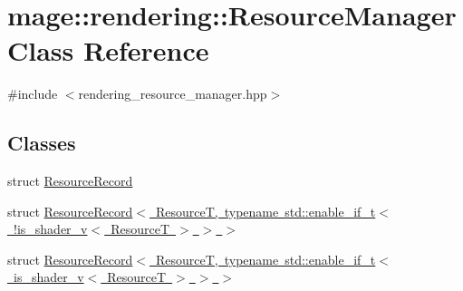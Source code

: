 \hypertarget{classmage_1_1rendering_1_1_resource_manager}{}\section{mage\+:\+:rendering\+:\+:Resource\+Manager Class Reference}
\label{classmage_1_1rendering_1_1_resource_manager}


{\ttfamily \#include $<$rendering\+\_\+resource\+\_\+manager.\+hpp$>$}

\subsection*{Classes}
\begin{DoxyCompactItemize}
\item 
struct \mbox{\hyperlink{structmage_1_1rendering_1_1_resource_manager_1_1_resource_record}{Resource\+Record}}
\item 
struct \mbox{\hyperlink{structmage_1_1rendering_1_1_resource_manager_1_1_resource_record_3_01_resource_t_00_01typename_0d1bec05cbaa53974b1eda0724091f851}{Resource\+Record$<$ Resource\+T, typename std\+::enable\+\_\+if\+\_\+t$<$ !is\+\_\+shader\+\_\+v$<$ Resource\+T $>$ $>$ $>$}}
\item 
struct \mbox{\hyperlink{structmage_1_1rendering_1_1_resource_manager_1_1_resource_record_3_01_resource_t_00_01typename_09b062ee4b0394619806084252c69f48d}{Resource\+Record$<$ Resource\+T, typename std\+::enable\+\_\+if\+\_\+t$<$ is\+\_\+shader\+\_\+v$<$ Resource\+T $>$ $>$ $>$}}
\end{DoxyCompactItemize}
